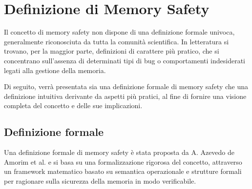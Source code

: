 \section{Definizione di Memory Safety}
\label{sec:memory_safety}

Il concetto di memory safety non dispone di una definizione formale univoca,
generalmente riconosciuta da tutta la comunità scientifica. In letteratura si trovano,
per la maggior parte, definizioni di carattere più pratico, che si concentrano
sull'assenza di determinati tipi di bug o comportamenti indesiderati legati alla
gestione della memoria.

Di seguito, verrà presentata sia una definizione formale di memory safety che una
definizione intuitiva derivante da aspetti più pratici, al fine di fornire una
visione completa del concetto e delle sue implicazioni.

\subsection{Definizione formale}
\label{sec:formal_definition}

Una definizione formale di memory safety è stata proposta da A. Azevedo de
Amorim et al.\cite{meaning_memory_safety} e si basa su una formalizzazione
rigorosa del concetto, attraverso un framework matematico basato su semantica operazionale
e strutture formali per ragionare sulla sicurezza della memoria in modo verificabile.

